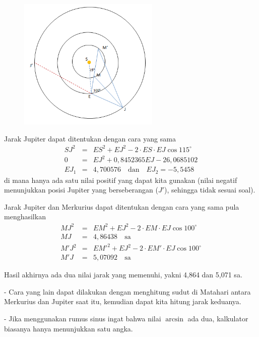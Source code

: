 \documentclass[11pt,fleqn, a4paper]{exam}
\begin{document}
\begin{questions}
\begin{figure}[H]
\centering
\includegraphics[width=0.6\textwidth]{gambar/25.png}
\end{figure}

Jarak Jupiter dapat ditentukan dengan cara yang sama 
\begin{eqnarray*}
SJ^2 &=& ES^2 + EJ^2 - 2 \cdot ES \cdot EJ \cos{115^{\circ}}\\
0 &=& EJ^2 + 0,8452365 EJ - 26,0685102\\
EJ_1 &=& 4,700576 \quad \text{dan} \quad EJ_2 =  -5,5458
\end{eqnarray*}
di mana hanya ada satu nilai positif yang dapat kita gunakan (nilai negatif menunjukkan posisi Jupiter yang berseberangan ($J'$), sehingga tidak sesuai soal).

Jarak Jupiter dan Merkurius dapat ditentukan dengan cara yang sama pula menghasilkan
\begin{eqnarray*}
MJ^2 &=& EM^2 + EJ^2 - 2 \cdot EM \cdot EJ \cos{100^{\circ}}\\
MJ &=& 4,86438 \quad \text{sa}\\
M'J^2 &=& EM'^2 + EJ^2 - 2 \cdot EM' \cdot EJ \cos{100^{\circ}}\\
M'J &=& 5,07092 \quad \text{sa}
\end{eqnarray*}

Hasil akhirnya ada dua nilai jarak yang memenuhi, yakni 4,864 dan 5,071 sa.

- Cara yang lain dapat dilakukan dengan menghitung sudut di Matahari antara Merkurius dan Jupiter saat itu, kemudian dapat kita hitung jarak keduanya. 

- Jika menggunakan rumus sinus ingat bahwa nilai $\arcsin$ ada dua, kalkulator biasanya hanya menunjukkan satu angka.

\end{questions}
\end{document}
